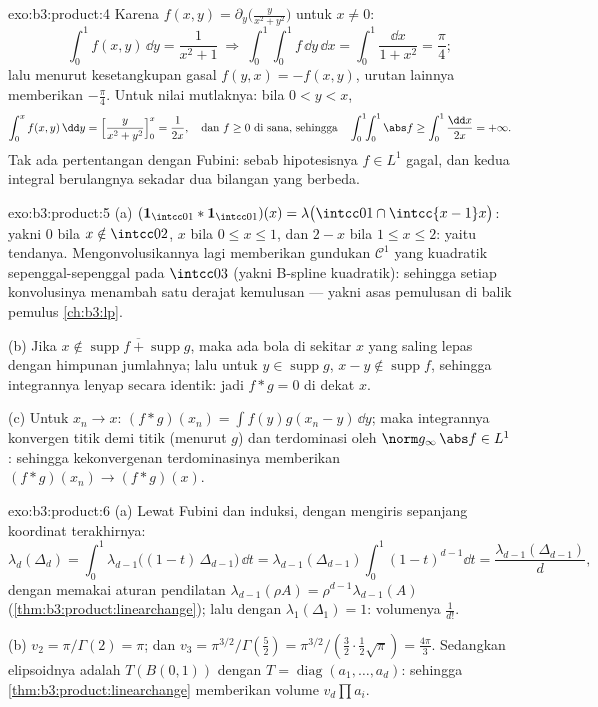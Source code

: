 \begin{solution}{exo:b3:product:4}
Karena $f(x,y) = \partial_y\bigl(\frac{y}{x^2+y^2}\bigr)$ untuk
$x \ne 0$:
\[
\int_0^1 f(x, y)\,\dd y = \frac{1}{x^2 + 1}
\ \Longrightarrow\
\int_0^1\!\!\int_0^1 f\,\dd y\,\dd x =
\int_0^1\frac{\dd x}{1 + x^2} = \frac\pi4 ;
\]
lalu menurut kesetangkupan gasal $f(y,x) = -f(x,y)$, urutan lainnya memberikan
$-\frac\pi4$. Untuk nilai mutlaknya: bila $0 < y < x$,
\[
\int_0^x f(x,y)\,\dd y = \Bigl[\frac{y}{x^2 +
y^2}\Bigr]_0^x = \frac1{2x},
\quad\text{dan } f \geq 0 \text{ di sana, sehingga}\quad
\int_0^1\!\!\int_0^1\abs f \geq \int_0^1\frac{\dd x}{2x} =
+\infty .
\]
Tak ada pertentangan dengan Fubini: sebab hipotesisnya $f \in L^1$
gagal, dan kedua integral berulangnya sekadar dua bilangan
yang berbeda.
\end{solution}

\begin{solution}{exo:b3:product:5}
(a) $(\mathbf 1_{\intcc01}*\mathbf 1_{\intcc01})(x) =
\lambda\bigl(\intcc01\cap\intcc{x-1}x\bigr)$: yakni $0$ bila $x
\notin \intcc02$, $x$ bila $0 \leq x \leq 1$, dan $2 - x$ bila $1
\leq x \leq 2$: yaitu tendanya. Mengonvolusikannya lagi memberikan gundukan
$\mathcal C^1$ yang kuadratik sepenggal-sepenggal pada $\intcc03$ (yakni
B-spline kuadratik): sehingga setiap konvolusinya menambah satu derajat kemulusan ---
yakni asas pemulusan di balik pemulus \cref{ch:b3:lp}.

(b) Jika $x \notin \overline{\operatorname{supp}f +
\operatorname{supp}g}$, maka ada bola di sekitar $x$ yang saling lepas
dengan himpunan jumlahnya; lalu untuk $y \in \operatorname{supp}g$, $x - y
\notin\operatorname{supp}f$, sehingga integrannya lenyap
secara identik: jadi $f * g = 0$ di dekat $x$.

(c) Untuk $x_n \to x$: $(f*g)(x_n) = \int
f(y)g(x_n - y)\,\dd y$; maka integrannya konvergen titik demi titik
(menurut \omterm{def:b3:topology:continuity}{kekontinuan} $g$) dan terdominasi oleh $\norm
g_\infty\,\abs f \in L^1$: sehingga kekonvergenan terdominasinya memberikan $(f*g)(x_n) \to (f*g)(x)$.
\end{solution}

\begin{solution}{exo:b3:product:6}
(a) Lewat Fubini dan induksi, dengan mengiris sepanjang koordinat
terakhirnya:
\[
\lambda_d(\Delta_d) = \int_0^1
\lambda_{d-1}\bigl((1 - t)\,\Delta_{d-1}\bigr)\,\dd t
= \lambda_{d-1}(\Delta_{d-1})\int_0^1(1 - t)^{d-1}\dd t
= \frac{\lambda_{d-1}(\Delta_{d-1})}{d},
\]
dengan memakai aturan pendilatan $\lambda_{d-1}(\rho A) =
\rho^{d-1}\lambda_{d-1}(A)$
(\cref{thm:b3:product:linearchange}); lalu dengan
$\lambda_1(\Delta_1) = 1$: volumenya $\frac1{d!}$.

(b) $v_2 = \pi/\Gamma(2) = \pi$; dan $v_3 =
\pi^{3/2}/\Gamma(\frac52) = \pi^{3/2}/(\frac32\cdot\frac12
\sqrt\pi) = \frac{4\pi}3$. Sedangkan elipsoidnya adalah $T(B(0,1))$ dengan
$T = \operatorname{diag}(a_1, \dots, a_d)$: sehingga
\cref{thm:b3:product:linearchange} memberikan volume
$v_d\prod a_i$.
\end{solution}

